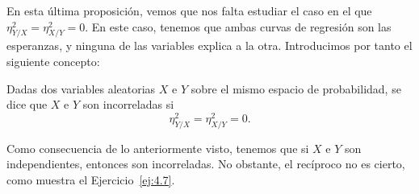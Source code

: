 En esta última proposición, vemos que nos falta estudiar el caso en el que $\eta_{Y/X}^2 = \eta_{X/Y}^2 = 0$. En este caso, tenemos que ambas curvas de regresión son las esperanzas, y ninguna de las variables explica a la otra. Introducimos por tanto el siguiente concepto:
\begin{definicion}[Incorrelación]
    Dadas dos variables aleatorias $X$ e $Y$ sobre el mismo espacio de probabilidad, se dice que $X$ e $Y$ son incorreladas si $$\eta_{Y/X}^2 = \eta_{X/Y}^2 = 0.$$
\end{definicion}

Como consecuencia de lo anteriormente visto, tenemos que si $X$ e $Y$ son independientes, entonces son incorreladas. No obstante, el recíproco no es cierto, como muestra el Ejercicio~\ref{ej:4.7}.